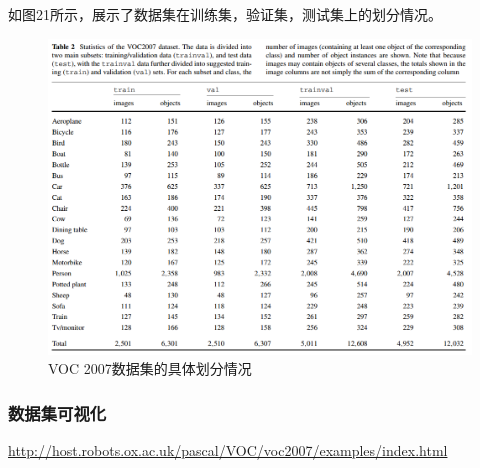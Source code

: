 \documentclass[UTF8]{ctexart}
\begin{document}
如图21所示，展示了数据集在训练集，验证集，测试集上的划分情况。
\begin{figure}[htbp]
    \centering
    \includegraphics[width=1.00\textwidth]{../img/VOC2007-stats.png}
    \caption{VOC 2007数据集的具体划分情况}
\end{figure}

\subsubsection{数据集可视化}
\url{http://host.robots.ox.ac.uk/pascal/VOC/voc2007/examples/index.html}
\end{document}
